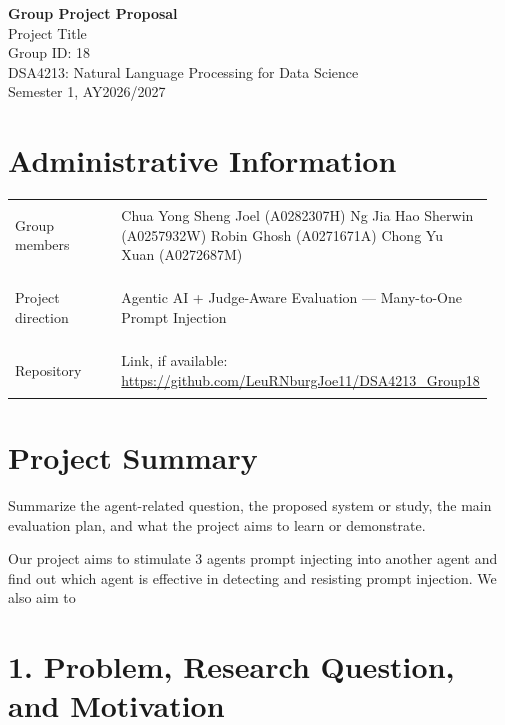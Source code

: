 \documentclass[11pt]{article}
\newcommand{\course}{DSA4213: Natural Language Processing for Data Science}
\newcommand{\semester}{Semester 1, AY2026/2027}
\begin{document}
\begin{center}
{\LARGE\bfseries Group Project Proposal}\\[0.4em]
{\large Project Title}\\[0.9em]
Group ID: 18 \underline{\hspace{3cm}}\\[0.9em]
\course\\
\semester
\end{center}

\section*{Administrative Information}

\begin{tabular}{@{}>{\bfseries\raggedright\arraybackslash}p{0.25\linewidth}
                    >{\raggedright\arraybackslash}p{0.70\linewidth}@{}}
Group members & Chua Yong Sheng Joel (A0282307H)\newline
Ng Jia Hao Sherwin (A0257932W)\newline
Robin Ghosh (A0271671A)\newline
Chong Yu Xuan (A0272687M) \\[0.7em]

Project direction & Agentic AI + Judge-Aware Evaluation --- Many-to-One Prompt Injection \\[0.7em]

Repository & Link, if available: \url{https://github.com/LeuRNburgJoe11/DSA4213_Group18} \\
\end{tabular}

\section*{Project Summary}

Summarize the agent-related question, the proposed system or study, the main
evaluation plan, and what the project aims to learn or demonstrate.

Our project aims to stimulate 3 agents prompt injecting into another agent and find out which agent is effective in detecting and resisting prompt injection.
We also aim to 

\section*{1. Problem, Research Question, and Motivation}
\end{document}
